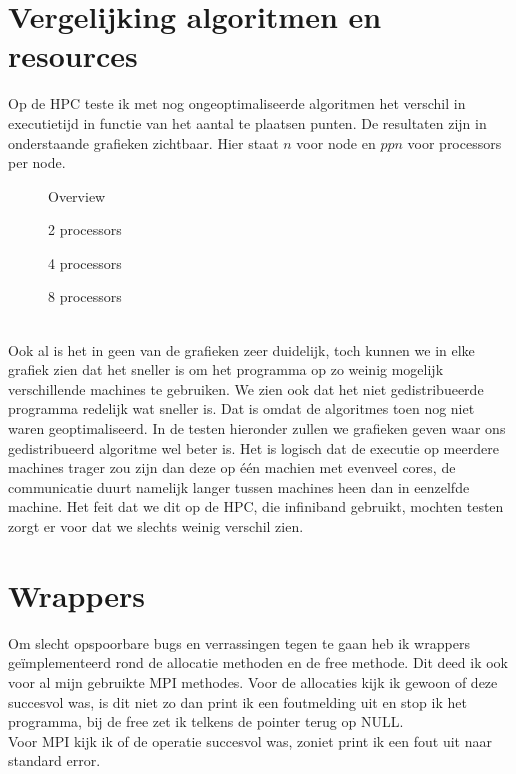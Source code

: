 \documentclass[a4paper]{article}
\begin{document}
\section{Vergelijking algoritmen en resources}
Op de HPC teste ik met nog ongeoptimaliseerde algoritmen het verschil in executietijd in functie van het aantal te plaatsen punten. De resultaten zijn in onderstaande grafieken zichtbaar. Hier staat $n$ voor node en $ppn$ voor processors per node.
\begin{figure}[!ht]
    \centering
    
    \caption{Overview}
\end{figure}
\begin{figure}[!ht]
    \centering
    
    \caption{2 processors}
\end{figure}
\begin{figure}[!ht]
    \centering
    
    \caption{4 processors}
\end{figure}
\begin{figure}[!ht]
    \centering
    
    \caption{8 processors}
\end{figure} \\
Ook al is het in geen van de grafieken zeer duidelijk, toch kunnen we in elke grafiek zien dat het sneller is om het programma op zo weinig mogelijk verschillende machines te gebruiken. We zien ook dat het niet gedistribueerde programma redelijk wat sneller is. Dat is omdat de algoritmes toen nog niet waren geoptimaliseerd. In de testen hieronder zullen we grafieken geven waar ons gedistribueerd algoritme wel beter is. Het is logisch dat de executie op meerdere machines trager zou zijn dan deze op \'e\'en machien met evenveel cores, de communicatie duurt namelijk langer tussen machines heen dan in eenzelfde machine. Het feit dat we dit op de HPC, die infiniband gebruikt, mochten testen zorgt er voor dat we slechts weinig verschil zien.
\section{Wrappers}
Om slecht opspoorbare bugs en verrassingen tegen te gaan heb ik wrappers ge\"implementeerd rond de allocatie methoden en de free methode. Dit deed ik ook voor al mijn gebruikte MPI methodes. Voor de allocaties kijk ik gewoon of deze succesvol was, is dit niet zo dan print ik een foutmelding uit en stop ik het programma, bij de free zet ik telkens de pointer terug op NULL.\\
Voor MPI kijk ik of de operatie succesvol was, zoniet print ik een fout uit naar standard error.
\end{document}
